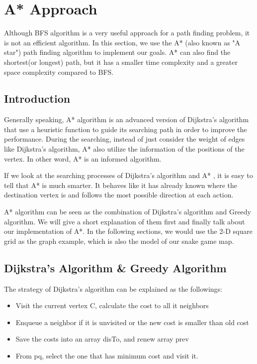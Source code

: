 \documentclass[12pt]{article}
\begin{document}
\section{A* Approach}
Although BFS algorithm is a very useful approach for a path finding problem, it is not an efficient algorithm. In this section, we use the A* (also known as "A star") path finding algorithm to implement our goals. A* can also find the shortest(or longest) path, but it has a smaller time complexity and a greater space complexity compared to BFS. 

\subsection{Introduction}
Generally speaking, A* algorithm is an advanced version of Dijkstra's algorithm that use a heuristic function to guide its searching path in order to improve the performance. During the searching, instead of just consider the weight of edges like Dijkstra's algorithm, A* also utilize the information of the positions of the vertex. In other word, A* is an informed algorithm. 

If we look at the searching processes of Dijkstra's algorithm and A* , it is easy to tell that A* is much smarter. It behaves like it has already known where the destination vertex is and follows the most possible direction at each action.

A* algorithm can be seen as the combination of Dijkstra's algorithm and Greedy algorithm. We will give a short explanation of them first and finally talk about our implementation of A*. In the following sections, we would use the 2-D square grid as the graph example, which is also the model of our snake game map.

\subsection{Dijkstra's Algorithm \& Greedy Algorithm}

The strategy of Dijkstra's algorithm can be explained as the followings:

\begin{itemize}
    \item Visit the current vertex C, calculate the cost to all it neighbors
    \item Enqueue a neighbor if it is unvisited or the new cost is smaller than old cost
    \item Save the costs into an array disTo, and renew array prev
    \item From pq, select the one that has minimum cost and visit it.
\end{itemize}
\end{document}
